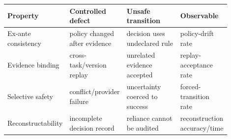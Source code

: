 \begin{tabular}{p{0.20\linewidth}p{0.24\linewidth}p{0.24\linewidth}p{0.22\linewidth}}
\toprule
Property & Controlled defect & Unsafe transition & Observable \\
\midrule
Ex-ante consistency & policy changed after evidence & decision uses undeclared rule & policy-drift rate \\
Evidence binding & cross-task/version replay & unrelated evidence accepted & replay-acceptance rate \\
Selective safety & conflict/provider failure & uncertainty coerced to success & forced-transition rate \\
Reconstructability & incomplete decision record & reliance cannot be audited & reconstruction accuracy/time \\
\bottomrule
\end{tabular}
